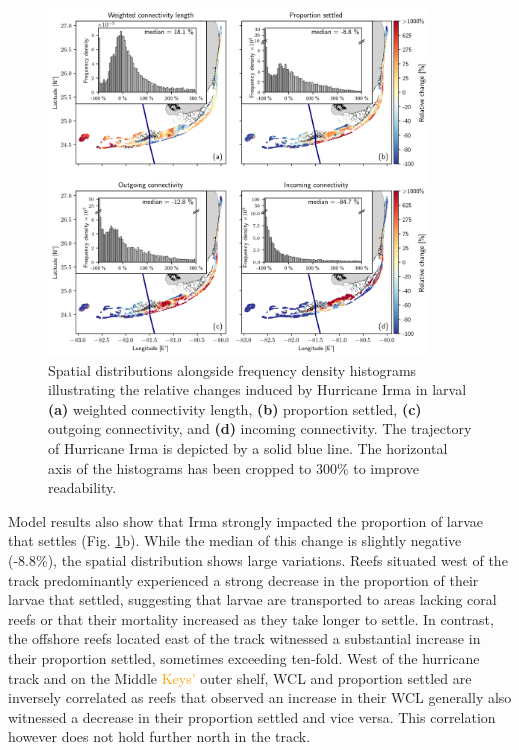 \documentclass[fleqn,10pt]{wlscirep}
\newcommand{\modif}[1]{\textcolor{orange}{#1}}
\begin{document}
\begin{figure}[tbp]
    \centering
    \includegraphics[width=0.9\textwidth]{figures/fig_connex_coral.png}
    \caption{Spatial distributions alongside frequency density histograms illustrating the relative changes induced by Hurricane Irma in larval \textbf{(a)} weighted connectivity length, \textbf{(b)} proportion settled, \textbf{(c)} outgoing connectivity, and \textbf{(d)} incoming connectivity. The trajectory of Hurricane Irma is depicted by a solid blue line. The horizontal axis of the histograms has been cropped to 300\% to improve readability.}
    \label{fig:Larvae}
\end{figure}

Model results also show that Irma strongly impacted the proportion of larvae that settles (Fig. \ref{fig:Larvae}b). While the median of this change is slightly negative (-8.8\%), the spatial distribution shows large variations. Reefs situated west of the track predominantly experienced a strong decrease in the proportion of their larvae that settled, suggesting that larvae are transported to areas lacking coral reefs or that their mortality increased as they take longer to settle. In contrast, the offshore reefs located east of the track witnessed a substantial increase in their proportion settled, sometimes exceeding ten-fold. West of the hurricane track and on the Middle \modif{Keys'} outer shelf, WCL and proportion settled are inversely correlated as reefs that observed an increase in their WCL generally also witnessed a decrease in their proportion settled and vice versa. This correlation however does not hold further north in the track.
\end{document}
